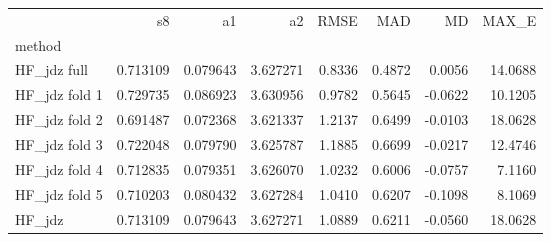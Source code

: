\begin{tabular}{lrrrrrrr}
 & s8 & a1 & a2 & RMSE & MAD & MD & MAX_E \\
method &  &  &  &  &  &  &  \\
HF_jdz full & 0.713109 & 0.079643 & 3.627271 & 0.8336 & 0.4872 & 0.0056 & 14.0688 \\
HF_jdz fold 1 & 0.729735 & 0.086923 & 3.630956 & 0.9782 & 0.5645 & -0.0622 & 10.1205 \\
HF_jdz fold 2 & 0.691487 & 0.072368 & 3.621337 & 1.2137 & 0.6499 & -0.0103 & 18.0628 \\
HF_jdz fold 3 & 0.722048 & 0.079790 & 3.625787 & 1.1885 & 0.6699 & -0.0217 & 12.4746 \\
HF_jdz fold 4 & 0.712835 & 0.079351 & 3.626070 & 1.0232 & 0.6006 & -0.0757 & 7.1160 \\
HF_jdz fold 5 & 0.710203 & 0.080432 & 3.627284 & 1.0410 & 0.6207 & -0.1098 & 8.1069 \\
HF_jdz & 0.713109 & 0.079643 & 3.627271 & 1.0889 & 0.6211 & -0.0560 & 18.0628 \\
\end{tabular}
